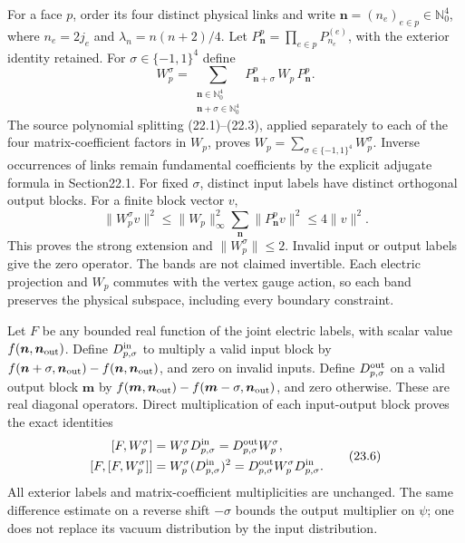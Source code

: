 \documentclass[
]{article}
\begin{document}
For a face \(p\), order its four distinct physical links and write
\(\boldsymbol n=(n_e)_{e\in p}\in\mathbb N_0^4\), where \(n_e=2j_e\) and
\(\lambda_n=n(n+2)/4\). Let
\(P_{\boldsymbol n}^{p}=\prod_{e\in p}P_{n_e}^{(e)}\), with the exterior
identity retained. For \(\sigma\in\{-1,1\}^4\) define \[
W_p^\sigma
 =\sum_{\substack{\boldsymbol n\in\mathbb N_0^4\\
                  \boldsymbol n+\sigma\in\mathbb N_0^4}}
 P_{\boldsymbol n+\sigma}^{p}\,W_p\,P_{\boldsymbol n}^{p}.
\tag{23.5}
\] The source polynomial splitting (22.1)--(22.3), applied separately to
each of the four matrix-coefficient factors in \(W_p\), proves
\(W_p=\sum_{\sigma\in\{-1,1\}^4}W_p^\sigma\). Inverse occurrences of
links remain fundamental coefficients by the explicit adjugate formula
in Section22.1. For fixed \(\sigma\), distinct input labels have
distinct orthogonal output blocks. For a finite block vector \(v\), \[
\|W_p^\sigma v\|^2
\le\|W_p\|_\infty^2\sum_{\boldsymbol n}
                  \|P_{\boldsymbol n}^{p}v\|^2
\le4\|v\|^2 .
\] This proves the strong extension and \(\|W_p^\sigma\|\le2\). Invalid
input or output labels give the zero operator. The bands are not claimed
invertible. Each electric projection and \(W_p\) commutes with the
vertex gauge action, so each band preserves the physical subspace,
including every boundary constraint.

Let \(F\) be any bounded real function of the joint electric labels,
with scalar value \(f(\boldsymbol n,\boldsymbol n_{\rm out})\). Define
\(D^{\rm in}_{p,\sigma}\) to multiply a valid input block by
\(f(\boldsymbol n+\sigma,\boldsymbol n_{\rm out})
-f(\boldsymbol n,\boldsymbol n_{\rm out})\), and zero on invalid inputs.
Define \(D^{\rm out}_{p,\sigma}\) on a valid output block
\(\boldsymbol m\) by \(f(\boldsymbol m,\boldsymbol n_{\rm out})
-f(\boldsymbol m-\sigma,\boldsymbol n_{\rm out})\), and zero otherwise.
These are real diagonal operators. Direct multiplication of each
input-output block proves the exact identities \[
\begin{aligned}
{}[F,W_p^\sigma]
 &=W_p^\sigma D^{\rm in}_{p,\sigma}
   =D^{\rm out}_{p,\sigma}W_p^\sigma,\\
[F,[F,W_p^\sigma]]
 &=W_p^\sigma(D^{\rm in}_{p,\sigma})^2
   =D^{\rm out}_{p,\sigma}W_p^\sigma D^{\rm in}_{p,\sigma}.
\end{aligned}\tag{23.6}
\] All exterior labels and matrix-coefficient multiplicities are
unchanged. The same difference estimate on a reverse shift \(-\sigma\)
bounds the output multiplier on \(\psi\); one does not replace its
vacuum distribution by the input distribution.
\end{document}
